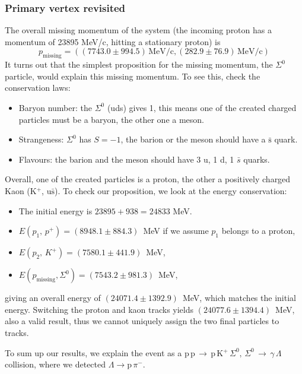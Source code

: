 \documentclass[twocolumn]{article}
\begin{document}
\subsubsection{Primary vertex revisited}
The overall missing momentum of the system (the incoming proton has a momentum of 23895 MeV/c, hitting a stationary proton) is
\begin{equation}
p_{\text{missing}} = ( (7743.0 \pm 994.5)\, \text{MeV/c,} \, (282.9 \pm 76.9) \, \text{MeV/c} ) \nonumber
\end{equation}
It turns out that the simplest proposition for the missing momentum, the $\Sigma^0$ particle, would explain this missing momentum. To see this, check the conservation laws:
\begin{itemize}
\item Baryon number: the $\Sigma^0$ (uds) gives 1, this means one of the created charged particles must be a baryon, the other one a meson.
\item Strangeness: $\Sigma^0$ has $S = -1$, the barion or the meson should have a $\bar{\text{s}}$ quark.
\item Flavours: the barion and the meson should have 3 u, 1 d, 1 $\bar{s}$ quarks.
\end{itemize}
Overall, one of the created particles is a proton, the other a positively charged Kaon (K$^+$, u$\bar{\text{s}}$). To check our proposition, we look at the energy conservation:
\begin{itemize}
\item The initial energy is $23895 + 938 = 24833$ MeV.
\item $E(p_1, \, p^+) = (8948.1 \pm 884.3)$~MeV if we assume $p_1$ belongs to a proton,
\item $E(p_2, \, K^+) = (7580.1 \pm 441.9)$~MeV,
\item $E(p_{\text{missing}}, \Sigma^0) = (7543.2 \pm 981.3)$~MeV,
\end{itemize}
giving an overall energy of $(24071.4 \pm 1392.9)$~MeV, which matches the initial energy. Switching the proton and kaon tracks yields $(24077.6 \pm 1394.4)$~MeV, also a valid result, thus we cannot uniquely assign the two final particles to tracks.
\par To sum up our results, we explain the event as a p$\,$p$\,\rightarrow\,$p$\,$K$^+\,\Sigma^0,\,\Sigma^0 \, \rightarrow \, \gamma \, \Lambda$ collision, where we detected  $\Lambda\rightarrow \text{p}\, \pi^-$.
\end{document}
